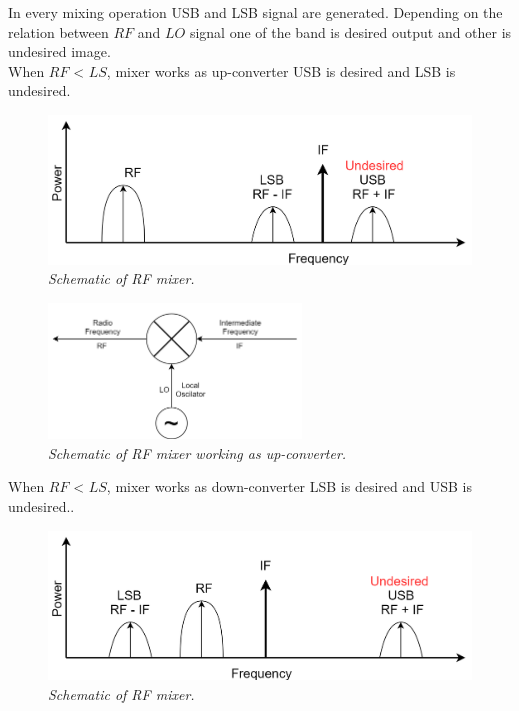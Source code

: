 \documentclass[en,printmode]{mgr}
\begin{document}
		In every mixing operation USB and LSB signal are generated. Depending on the relation between $RF$ and $LO$
		signal one of the band is desired output and other is undesired image.
		\\
		
		When $RF$ < $LS$, mixer works as up-converter USB is desired and LSB is undesired.
		\begin{figure}[!htb]
    		\centering
   			\includegraphics[width=\textwidth]{diag/upconv.png}
    		\caption{\textit{Schematic of RF mixer.}}
		\end{figure}
		
		\begin{figure}[!htb]
    		\centering
   			\includegraphics[width=0.6\textwidth]{diag/upmx.png}
    		\caption{\textit{Schematic of RF mixer working as up-converter.}}
		\end{figure}
		
		When $RF$ < $LS$, mixer works as down-converter LSB is desired and USB is undesired..
		\begin{figure}[!htb]
    		\centering
   			\includegraphics[width=\textwidth]{diag/downconv.png}
    		\caption{\textit{Schematic of RF mixer.}}
		\end{figure}
		
\end{document}
